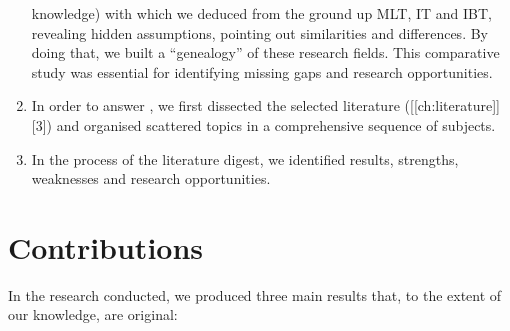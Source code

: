 \documentclass[
  letterpaper,
  12pt,
  british]{tufte-book}
\theoremstyle{plain}
\theoremstyle{plain}
\theoremstyle{definition}
\theoremstyle{remark}
\begin{document}
\begin{enumerate}
  knowledge) with which we deduced from the ground up {MLT}, {IT} and
  {IBT}, revealing hidden assumptions, pointing out similarities and
  differences. By doing that, we built a ``genealogy'' of these research
  fields. This comparative study was essential for identifying missing
  gaps and research opportunities.
\item
  In order to answer , we first dissected the selected literature
  ({[}{[}ch:literature{]}{]}{[}3{]}) and organised scattered topics in a
  comprehensive sequence of subjects.
\item
  In the process of the literature digest, we identified results,
  strengths, weaknesses and research opportunities.
\end{enumerate}

\hypertarget{contributions}{%
\section{Contributions}\label{contributions}}

In the research conducted, we produced three main results that, to the
extent of our knowledge, are original:
\end{document}
